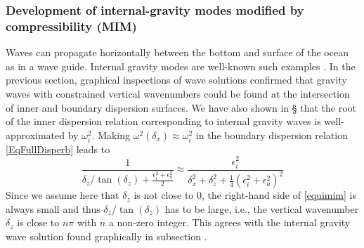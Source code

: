 \subsubsection{Development of internal-gravity modes modified by compressibility (MIM)}
\label{SubSectionGraphicMIW}
Waves can propagate horizontally between the bottom and surface of the ocean as in a wave guide. Internal gravity modes are  well-known such examples \citep{gill_1982}. In the previous section, graphical inspections of wave solutions confirmed that gravity waves with constrained vertical wavenumbers could be found at the intersection of inner and boundary dispersion surfaces.
We have also shown in \S{} that the root of the inner dispersion relation corresponding to internal gravity waves is well-approximated by $\omega_i^2$. Making $\omega^2(\delta_x) \approx\omega_i^2$ in the boundary dispersion relation \ref{EqFullDisperb} leads to 
%
\begin{equation}
		\frac{1}
{\delta_z/\tan(\delta_z)+\frac{\epsilon_i^2+\epsilon_a^2}{2}}
\approx
\frac{\epsilon_i^2}{\delta_x^2
	+\delta_z^2+\frac{1}{4}\left(
	\epsilon_i^2+\epsilon_a^2\right)^2}
\label{equimim}
\end{equation}
Since we assume here that $\delta_z$ is not close to 0, the right-hand side of \ref{equimim} is always small and thus $\delta_z/\tan(\delta_z)$ has to be large, i.e., the vertical wavenumber $\delta_z$ is close to $n\pi$ with $n$ a non-zero integer. This agrees with the internal gravity wave solution found graphically in subsection .

